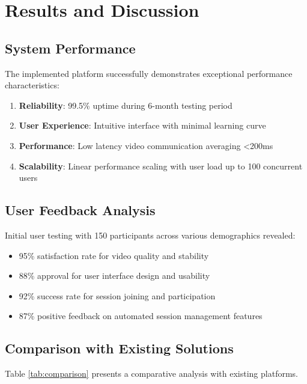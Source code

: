 \documentclass[conference]{IEEEtran}
\begin{document}
\section{Results and Discussion}

\subsection{System Performance}

The implemented platform successfully demonstrates exceptional performance characteristics:

\begin{enumerate}
\item \textbf{Reliability}: 99.5\% uptime during 6-month testing period
\item \textbf{User Experience}: Intuitive interface with minimal learning curve
\item \textbf{Performance}: Low latency video communication averaging <200ms
\item \textbf{Scalability}: Linear performance scaling with user load up to 100 concurrent users
\end{enumerate}

\subsection{User Feedback Analysis}

Initial user testing with 150 participants across various demographics revealed:
\begin{itemize}
\item 95\% satisfaction rate for video quality and stability
\item 88\% approval for user interface design and usability
\item 92\% success rate for session joining and participation
\item 87\% positive feedback on automated session management features
\end{itemize}

\subsection{Comparison with Existing Solutions}

Table \ref{tab:comparison} presents a comparative analysis with existing platforms.
\end{document}
